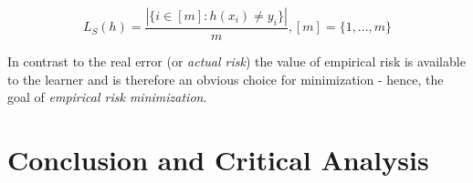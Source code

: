 \documentclass[10pt,conference]{IEEEtran}
\begin{document}
  \begin{equation}
    \label{trainingerror}
    L_S(h) = \frac{|\{i \in [m] : h(x_i) \neq y_i\}|}{m}, [m] = \{1, ..., m\}
  \end{equation}

  In contrast to the real error (or \emph{actual risk}) the value of empirical risk is available to the learner and is therefore an obvious choice for minimization - hence, the goal of \emph{empirical risk minimization}.

  

\section{Conclusion and Critical Analysis}
  
\nocite{*}




\vspace{12pt}
\end{document}
